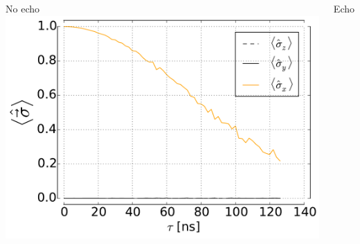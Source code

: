 \documentclass[aspectratio=169, 13pt, t]{beamer}
\begin{document}
\begin{frame}[t]
{\begin{columns}[c]
	No echo
	\centering
	\includegraphics[width=\textwidth]{deph_pink_se}
	
	Echo
	\end{columns}
}
\end{frame}
\end{document}
